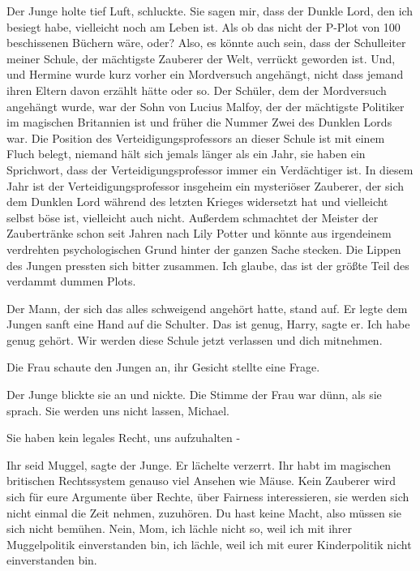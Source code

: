 Der Junge holte tief Luft, schluckte. \glqq{}Sie sagen mir, dass der Dunkle Lord,
den ich besiegt habe, vielleicht noch am Leben ist. Als ob das nicht der P-Plot
von 100 beschissenen Büchern wäre, oder? Also, es könnte auch sein, dass der
Schulleiter meiner Schule, der mächtigste Zauberer der Welt, verrückt geworden ist.
Und, und Hermine wurde kurz vorher ein Mordversuch angehängt, nicht dass jemand
ihren Eltern davon erzählt hätte oder so. Der Schüler, dem der Mordversuch
angehängt wurde, war der Sohn von Lucius Malfoy, der der mächtigste Politiker im
magischen Britannien ist und früher die Nummer Zwei des Dunklen Lords war. Die
Position des Verteidigungsprofessors an dieser Schule ist mit einem Fluch
belegt, niemand hält sich jemals länger als ein Jahr, sie haben ein Sprichwort,
dass der Verteidigungsprofessor immer ein Verdächtiger ist. In diesem Jahr ist
der Verteidigungsprofessor insgeheim ein mysteriöser Zauberer, der sich dem
Dunklen Lord während des letzten Krieges widersetzt hat und vielleicht selbst
böse ist, vielleicht auch nicht. Außerdem schmachtet der Meister der
Zaubertränke schon seit Jahren nach Lily Potter und könnte aus irgendeinem
verdrehten psychologischen Grund hinter der ganzen Sache stecken.\grqq{} Die
Lippen des Jungen pressten sich bitter zusammen. \glqq{}Ich glaube, das ist der
größte Teil des verdammt dummen Plots.\grqq{}

Der Mann, der sich das alles schweigend angehört hatte, stand auf. Er legte dem
Jungen sanft eine Hand auf die Schulter. \glqq{}Das ist genug, Harry\grqq{},
sagte er. \glqq{}Ich habe genug gehört. Wir werden diese Schule jetzt verlassen
und dich mitnehmen.\grqq{}

Die Frau schaute den Jungen an, ihr Gesicht stellte eine Frage.

Der Junge blickte sie an und nickte. Die Stimme der Frau war dünn, als sie
sprach. \glqq{}Sie werden uns nicht lassen, Michael.\grqq{}

\glqq{}Sie haben kein legales Recht, uns aufzuhalten -\grqq{}

\glqq{}Ihr seid Muggel\grqq{}, sagte der Junge. Er lächelte verzerrt. \glqq{}Ihr
habt im magischen britischen Rechtssystem genauso viel Ansehen wie Mäuse. Kein
Zauberer wird sich für eure Argumente über Rechte, über Fairness interessieren,
sie werden sich nicht einmal die Zeit nehmen, zuzuhören. Du hast keine Macht,
also müssen sie sich nicht bemühen. Nein, Mom, ich lächle nicht so, weil ich mit
ihrer Muggelpolitik einverstanden bin, ich lächle, weil ich mit eurer
Kinderpolitik nicht einverstanden bin.\grqq{}

